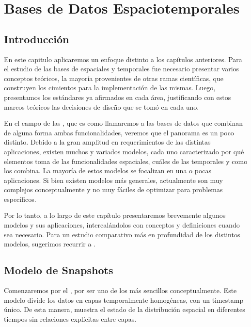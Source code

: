 \chapter{Bases de Datos Espaciotemporales}  \label{cap:et}

\section{Introducción} \label{sec:st:intro}

En este capitulo aplicaremos un enfoque distinto a los capítulos anteriores.
Para el estudio de las bases de espaciales y temporales fue necesario presentar varios conceptos teóricos,
la mayoría provenientes de otras ramas científicas, que construyen los cimientos para la implementación de las mismas.
Luego, presentamos los estándares ya afirmados en cada área, justificando con estos marcos teóricos las decisiones de diseño que se tomó en cada uno.

En el campo de las ,
que es como llamaremos a las bases de datos que combinan de alguna forma ambas funcionalidades,
veremos que el panorama es un poco distinto.
Debido a la gran amplitud en requerimientos de las distintas aplicaciones,
existen muchos y variados modelos, cada uno caracterizado por
qué elementos toma de las funcionalidades espaciales, cuáles de las temporales y como los combina.
La mayoría de estos modelos se focalizan en una o pocas aplicaciones.
Si bien existen modelos más generales, actualmente son muy complejos conceptualmente
y no muy fáciles de optimizar para problemas específicos.

Por lo tanto, a lo largo de este capítulo presentaremos brevemente algunos modelos y sus aplicaciones, intercalándolos con conceptos y definiciones cuando sea necesario.
Para un estudio comparativo más en profundidad de los distintos modelos, sugerimos recurrir a \cite{sp:litreview}.

\section{Modelo de Snapshots}

Comenzaremos por el \textsuperscript{\cite{sp:snapshot}}, por ser uno de los más sencillos conceptualmente.
Este modelo divide los datos en capas temporalmente homogéneas, con un timestamp único.
De esta manera, muestra el estado de la distribución espacial en diferentes tiempos sin relaciones explícitas entre capas.

